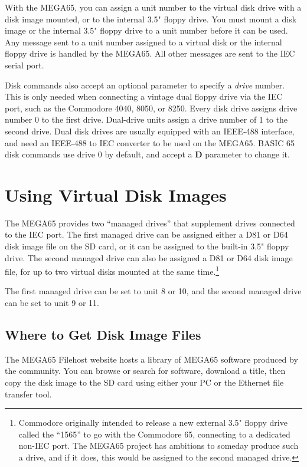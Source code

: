 With the MEGA65, you can assign a unit number to the virtual disk drive with a disk image mounted, or to the internal 3.5" floppy drive. You must mount a disk image or the internal 3.5" floppy drive to a unit number before it can be used. Any message sent to a unit number assigned to a virtual disk or the internal floppy drive is handled by the MEGA65. All other messages are sent to the IEC serial port.

Disk commands also accept an optional parameter to specify a {\it drive} number. This is only needed when connecting a vintage dual floppy drive via the IEC port, such as the Commodore 4040, 8050, or 8250. Every disk drive assigns drive number 0 to the first drive. Dual-drive units assign a drive number of 1 to the second drive. Dual disk drives are usually equipped with an IEEE-488 interface, and need an IEEE-488 to IEC converter to be used on the MEGA65. BASIC 65 disk commands use drive 0 by default, and accept a {\bf D} parameter to change it.


\section{Using Virtual Disk Images}

The MEGA65 provides two ``managed drives'' that supplement drives connected to the IEC port. The first managed drive can be assigned either a D81 or D64 disk image file on the SD card, or it can be assigned to the built-in 3.5" floppy drive. The second managed drive can also be assigned a D81 or D64 disk image file, for up to two virtual disks mounted at the same time.\footnote{Commodore originally intended to release a new external 3.5" floppy drive called the ``1565'' to go with the Commodore 65, connecting to a dedicated non-IEC port. The MEGA65 project has ambitions to someday produce such a drive, and if it does, this would be assigned to the second managed drive.}

The first managed drive can be set to unit 8 or 10, and the second managed drive can be set to unit 9 or 11.

\subsection{Where to Get Disk Image Files}

The MEGA65 Filehost website hosts a library of MEGA65 software produced by the community. You can browse or search for software, download a title, then copy the disk image to the SD card using either your PC or the Ethernet file transfer tool.

